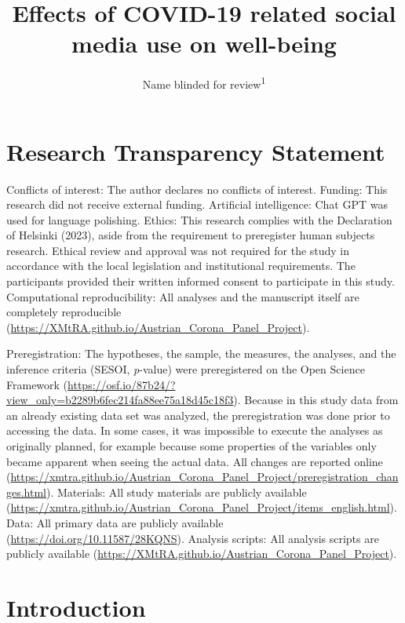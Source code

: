 \documentclass[
  man,mask,floatsintext]{apa7}
\title{Effects of COVID-19 related social media use on well-being}
\author{Name blinded for review\textsuperscript{1}}
\date{}
\affiliation{\vspace{0.5cm}\textsuperscript{1} }
\begin{document}
\maketitle

\section{Research Transparency Statement}\label{research-transparency-statement}

Conflicts of interest: The author declares no conflicts of interest. Funding: This research did not receive external funding. Artificial intelligence: Chat GPT was used for language polishing. Ethics: This research complies with the Declaration of Helsinki (2023), aside from the requirement to preregister human subjects research. Ethical review and approval was not required for the study in accordance with the local legislation and institutional requirements. The participants provided their written informed consent to participate in this study. Computational reproducibility: All analyses and the manuscript itself are completely reproducible (\url{https://XMtRA.github.io/Austrian_Corona_Panel_Project}).

Preregistration: The hypotheses, the sample, the measures, the analyses, and the inference criteria (SESOI, \emph{p}-value) were preregistered on the Open Science Framework (\url{https://osf.io/87b24/?view_only=b2289b6fec214fa88ee75a18d45c18f3}).
Because in this study data from an already existing data set was analyzed, the preregistration was done prior to accessing the data.
In some cases, it was impossible to execute the analyses as originally planned, for example because some properties of the variables only became apparent when seeing the actual data.
All changes are reported online (\url{https://xmtra.github.io/Austrian_Corona_Panel_Project/preregistration_changes.html}).
Materials: All study materials are publicly available (\url{https://xmtra.github.io/Austrian_Corona_Panel_Project/items_english.html}). Data: All primary data are publicly available (\url{https://doi.org/10.11587/28KQNS}). Analysis scripts: All analysis scripts are publicly available (\url{https://XMtRA.github.io/Austrian_Corona_Panel_Project}).

\newpage

\section{Introduction}\label{introduction}
\end{document}
